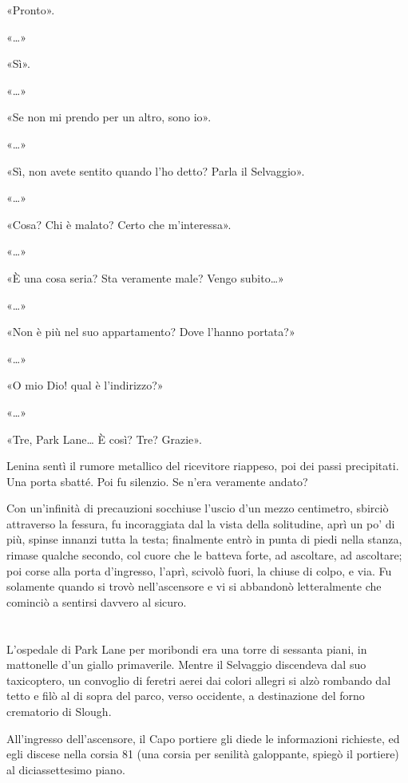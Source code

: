 \documentclass[
a5paper, %
10pt, %
twoside, 
onecolumn, %
openany, %
]{memoir}
\begin{document}
«Pronto».

«…»

«Sì».

«…»

«Se non mi prendo per un altro, sono io».

«…»

«Sì, non avete sentito quando l’ho detto? Parla il Selvaggio».

«…»

«Cosa? Chi è malato? Certo che m’interessa».

«…»

«È una cosa seria? Sta veramente male? Vengo subito…»

«…»

«Non è più nel suo appartamento? Dove l’hanno portata?»

«…»

«O mio Dio! qual è l’indirizzo?»

«…»

«Tre, Park Lane… È così? Tre? Grazie».

Lenina sentì il rumore metallico del ricevitore riappeso, poi dei passi precipitati. Una porta sbatté. Poi fu silenzio. Se n’era veramente andato?

Con un’infinità di precauzioni socchiuse l’uscio d’un mezzo centimetro, sbirciò attraverso la fessura, fu incoraggiata dal la vista della solitudine, aprì un po’ di più, spinse innanzi tutta la testa; finalmente entrò in punta di piedi nella stanza, rimase qualche secondo, col cuore che le batteva forte, ad ascoltare, ad ascoltare; poi corse alla porta d’ingresso, l’aprì, scivolò fuori, la chiuse di colpo, e via. Fu solamente quando si trovò nell’ascensore e vi si abbandonò letteralmente che cominciò a sentirsi davvero al sicuro.

\chapter{\phantom{title}}

\lettrine{L}{\phantom{a}}’ospedale di Park Lane per moribondi era una torre di sessanta piani, in mattonelle d’un giallo primaverile. Mentre il Selvaggio discendeva dal suo taxicoptero, un convoglio di feretri aerei dai colori allegri si alzò rombando dal tetto e filò al di sopra del parco, verso occidente, a destinazione del forno crematorio di Slough.

All’ingresso dell’ascensore, il Capo portiere gli diede le informazioni richieste, ed egli discese nella corsia 81 (una corsia per senilità galoppante, spiegò il portiere) al diciassettesimo piano.
\end{document}

